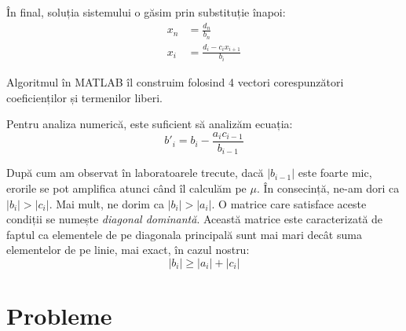 \documentclass{exam}
\newcommand{\octavescript}[2]{
	
}
\begin{document}
În final, soluția sistemului o găsim prin substituție înapoi:
\begin{align*}
	x_n & = \frac{d_n}{b_n}                 \\
	x_i & = \frac{d_i - c_i x_{i + 1}}{b_i}
\end{align*}

Algoritmul în MATLAB îl construim folosind 4 vectori corespunzători
coeficienților și termenilor liberi.

\newpage
\octavescript{./src/Thomas.m}{}

Pentru analiza numerică, este suficient să analizăm ecuația:
\begin{equation*}
	b'_i = b_i - \frac{a_i c_{i - 1}}{b_{i - 1}}
\end{equation*}

După cum am observat în laboratoarele trecute, dacă $|b_{i - 1}|$ este foarte mic,
erorile se pot amplifica atunci când îl calculăm pe $\mu$. În consecință, ne-am
dori ca $|b_i| > |c_i|$. Mai mult, ne dorim ca $|b_i| > |a_i|$. O matrice care
satisface aceste condiții se numește \textit{diagonal dominantă}. Această
matrice este caracterizată de faptul ca elementele de pe diagonala principală
sunt mai mari decât suma elementelor de pe linie, mai exact, în cazul nostru:
\begin{equation*}
	|b_i| \geq |a_i| + |c_i|
\end{equation*}

\section{Probleme}
\end{document}
